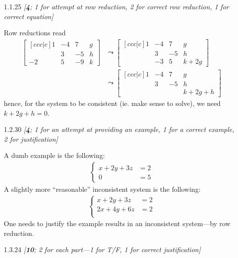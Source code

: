 \documentclass{amsart}
\theoremstyle{definition}
\theoremstyle{definition}
\DeclareMathOperator{\1}{\mathbbm{1}}
\begin{document}
\begin{enumerate}[itemsep = 2mm]
	\item[1.1.25] \textit{[\textbf{4}; 1 for attempt at row reduction, 2 for correct row reduction, 1 for correct equation]}
	
	
	Row reductions read
	\begin{align*}
	\begin{bmatrix}[c c c | c]
	1 & -4 & 7 & g \\
	 & 3 & -5 & h \\
	-2 & 5 & -9 & k
	\end{bmatrix} &\leadsto \begin{bmatrix}[c c c | c]
	1 & -4 & 7 & g \\
	& 3 & -5 & h \\
	 & -3 & 5 & k + 2g
	\end{bmatrix} \\
	&\leadsto \begin{bmatrix}[c c c | c]
	1 & -4 & 7 & g \\
	& 3 & -5 & h \\
	&  &  & k + 2g + h
	\end{bmatrix} 
	\end{align*}
	hence, for the system to be consistent (ie. make sense to solve), we need $k + 2g + h = 0$.
	
	
	\item[1.2.30] \textit{[\textbf{4}; 1 for an attempt at providing an example, 1 for a correct example, 2 for justification]}
	
	A dumb example is the following:
	\begin{align*}
	\begin{cases}
		x + 2y + 3z &= 2 \\
		0 &= 5
	\end{cases}
	\end{align*}
	A slightly more ``reasonable'' inconsistent system is the following:
	\begin{align*}
	\begin{cases}
	x + 2y + 3z &= 2 \\
	2x + 4y + 6z &= 2 \\
	\end{cases}
	\end{align*}
	One needs to justify the example results in an inconsistent system---by row reduction.
	
	\item[1.3.24] \textit{[\textbf{10}; 2 for each part---1 for T/F, 1 for correct justification]}
	

\end{enumerate}
\end{document}
